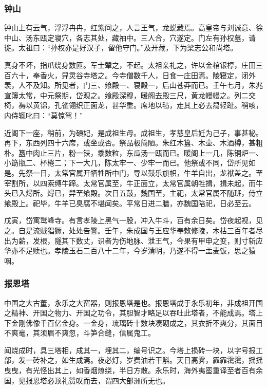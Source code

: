 \documentclass[]{article}
\begin{document}
\hypertarget{header-n14}{%
\subsubsection{钟山}\label{header-n14}}

钟山上有云气，浮浮冉冉，红紫间之，人言王气，龙蜕藏焉。高皇帝与刘诚意、徐中山、汤东瓯定寝穴，各志其处，藏袖中。三人合，穴遂定。门左有孙权墓，请徙。太祖曰：``孙权亦是好汉子，留他守门。''及开藏，下为梁志公和尚塔。

真身不坏，指爪绕身数匝。军士辇之，不起。太祖亲礼之，许以金棺银椁，庄田三百六十，奉香火，舁灵谷寺塔之。今寺僧数千人，日食一庄田焉。陵寝定，闭外羡，人不及知。所见者，门三、飨殿一、寝殿一，后山苍莽而已。壬午七月，朱兆宣簿太常，中元祭期，岱观之。飨殿深穆，暖阁去殿三尺，黄龙幔幔之。列二交椅，褥以黄锦，孔雀翎织正面龙，甚华重。席地以毡，走其上必去舄轻趾。稍咳，内侍辄叱曰：``莫惊驾！''

近阁下一座，稍前，为碽妃，是成祖生母。成祖生，孝慈皇后妊为己子，事甚秘。再下，东西列四十六席，或坐或否。祭品极简陋。朱红木簋、木壶、木酒樽，甚粗朴。簋中肉止三片，粉一铗，黍数粒，东瓜汤一瓯而已。暖阁上一几，陈铜炉一、小筯瓶二、杯棬二；下一大几，陈太牢一、少牢一而已。他祭或不同，岱所见如是。先祭一日，太常官属开牺牲所中门，导以鼓乐旗帜，牛羊自出，龙袱盖之。至宰割所，以四索缚牛蹄。太常官属至，牛正面立，太常官属朝牲揖，揖未起，而牛头已入燖所。燖已，舁至飨殿。次日五鼓，魏国至，主祀，太常官属不随班，侍立飨殿上。祀毕，牛羊已臭腐不堪闻矣。平常日进二膳，亦魏国陪祀，日必至云。

戊寅，岱寓鹫峰寺。有言孝陵上黑气一股，冲入牛斗，百有余日矣。岱夜起视，见之。自是流贼猖獗，处处告警。壬午，朱成国与王应华奉敕修陵，木枯三百年者尽出为薪，发根，隧其下数丈，识者为伤地脉、泄王气，今果有甲申之变，则寸斩应华亦不足赎也。孝陵玉石二百八十二年，今岁清明，乃遂不得一盂麦饭，思之猿咽。

\hypertarget{header-n22}{%
\subsubsection{报恩塔}\label{header-n22}}

中国之大古董，永乐之大窑器，则报恩塔是也。报恩塔成于永乐初年，非成祖开国之精神、开国之物力、开国之功令，其胆智才略足以吞吐此塔者，不能成焉。塔上下金刚佛像千百亿金身。一金身，琉璃砖十数块凑砌成之，其衣折不爽分，其面目不爽毫，其须眉不爽忽，斗笋合缝，信属鬼工。

闻烧成时，具三塔相，成其一，埋其二，编号识之。今塔上损砖一块，以字号报工部，发一砖补之，如生成焉。夜必灯，岁费油若干斛。天日高霁，霏霏霭霭，摇摇曳曳，有光怪出其上，如香烟燎绕，半日方散。永乐时，海外夷蛮重译至者百有余国，见报恩塔必顶礼赞叹而去，谓四大部洲所无也。
\end{document}
